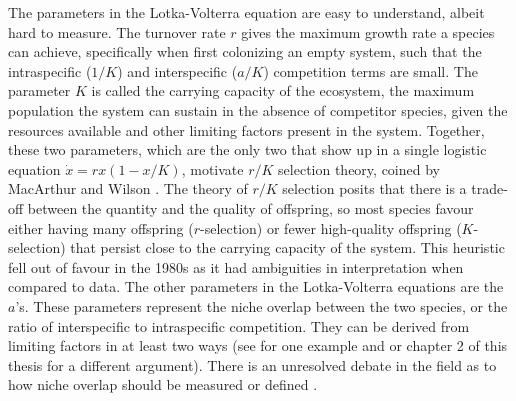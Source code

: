 The parameters in the Lotka-Volterra equation are easy to understand, albeit hard to measure. 
The turnover rate $r$ gives the maximum growth rate a species can achieve, specifically when first colonizing an empty system, such that the intraspecific ($1/K$) and interspecific ($a/K$) competition terms are small. 
The parameter $K$ is called the carrying capacity of the ecosystem, the maximum population the system can sustain in the absence of competitor species, given the resources available and other limiting factors present in the system. 
Together, these two parameters, which are the only two that show up in a single logistic equation $\dot{x}=rx(1-x/K)$, motivate $r/K$ selection theory, coined by MacArthur and Wilson \cite{MacArthur1967a}. 
The theory of $r/K$ selection posits that there is a trade-off between the quantity and the quality of offspring, so most species favour either having many offspring ($r$-selection) or fewer high-quality offspring ($K$-selection) that persist close to the carrying capacity of the system. 
This heuristic fell out of favour in the 1980s as it had ambiguities in interpretation when compared to data. %
%
The other parameters in the Lotka-Volterra equations are the $a$'s. 
These parameters represent the niche overlap between the two species, or the ratio of interspecific to intraspecific competition. 
They can be derived from limiting factors in at least two ways (see \cite{MacArthur1967} for one example and \cite{MacArthur1970} or chapter 2 of this thesis for a different argument).  %
There is an unresolved debate in the field as to how niche overlap should be measured or defined \cite{Klopfer1961,Pianka1973,Pianka1974,Abrams1977,Hurlbert1978,Connell1980,Abrams1980,Schoener1985,Chesson1990,Leibold1995,Chesson2008}. 

